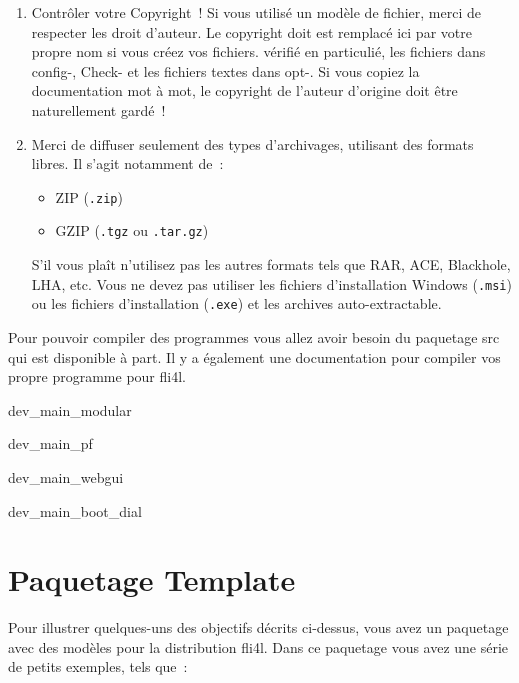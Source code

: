 \begin{enumerate}
    \item Contrôler votre Copyright~! Si vous utilisé un modèle de fichier,
    merci de respecter les droit d'auteur. Le copyright doit est remplacé
    ici par votre propre nom si vous créez vos fichiers. vérifié en particulié,
    les fichiers dans config-, Check- et les fichiers textes dans opt-. Si vous
    copiez la documentation mot à mot, le copyright de l'auteur d'origine
    doit être naturellement gardé~!

    \item Merci de diffuser seulement des types d'archivages, utilisant des
    formats libres. Il s'agit notamment de~:
    \begin{itemize}
      \item ZIP  (\texttt{.zip})
      \item GZIP (\texttt{.tgz} ou \texttt{.tar.gz})
    \end{itemize}
    S'il vous plaît n'utilisez pas les autres formats tels que RAR, ACE, Blackhole,
	LHA, etc.
	Vous ne devez pas utiliser les fichiers d'installation Windows (\texttt{.msi}) ou
	les fichiers d'installation (\texttt{.exe}) et les archives auto-extractable.
  \end{enumerate}



Pour pouvoir compiler des programmes vous allez avoir besoin du paquetage
\og{}src\fg{} qui est disponible à part. Il y a également une documentation
pour compiler vos propre programme pour fli4l.

 {dev_main_modular}



 {dev_main_pf}

 {dev_main_webgui}

 {dev_main_boot_dial}

\section{Paquetage Template}

Pour illustrer quelques-uns des objectifs décrits ci-dessus, vous avez un
paquetage avec des modèles pour la distribution fli4l. Dans ce paquetage vous avez
une série de petits exemples, tels que~:

